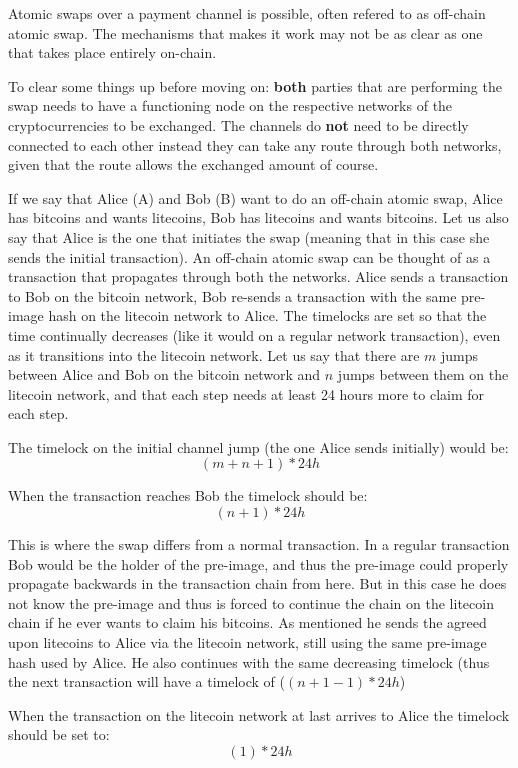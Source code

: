 Atomic swaps over a payment channel is possible, often refered to as off-chain atomic swap. The mechanisms that makes it work may not be as clear as one that takes place entirely on-chain. 

To clear some things up before moving on: \textbf{both} parties that are performing the swap needs to have a functioning node on the respective networks of the cryptocurrencies to be exchanged. The channels do \textbf{not} need to be directly connected to each other instead they can take any route through both networks, given that the route allows the exchanged amount of course.

If we say that Alice (A) and Bob (B) want to do an off-chain atomic swap, Alice has bitcoins and wants litecoins, Bob has litecoins and wants bitcoins. Let us also say that Alice is the one that initiates the swap (meaning that in this case she sends the initial transaction). An off-chain atomic swap can be thought of as a transaction that propagates through both the networks. Alice sends a transaction to Bob on the bitcoin network, Bob re-sends a transaction with the same pre-image hash on the litecoin network to Alice. The timelocks are set so that the time continually decreases (like it would on a regular network transaction), even as it transitions into the litecoin network. Let us say that there are $m$ jumps between Alice and Bob on the bitcoin network and $n$ jumps between them on the litecoin network, and that each step needs at least 24 hours more to claim for each step. 

The timelock on the initial channel jump (the one Alice sends initially) would be:
$$(m+n+1) * 24h$$

When the transaction reaches Bob the timelock should be: 
$$(n+1) * 24h$$

This is where the swap differs from a normal transaction. In a regular transaction Bob would be the holder of the pre-image, and thus the pre-image could properly propagate backwards in the transaction chain from here. But in this case he does not know the pre-image and thus is forced to continue the chain on the litecoin chain if he ever wants to claim his bitcoins. As mentioned he sends the agreed upon litecoins to Alice via the litecoin network, still using the same pre-image hash used by Alice. He also continues with the same decreasing timelock (thus the next transaction will have a timelock of ($(n+1 - 1) * 24h$)

When the transaction on the litecoin network at last arrives to Alice the timelock should be set to:
$$(1) * 24h$$

